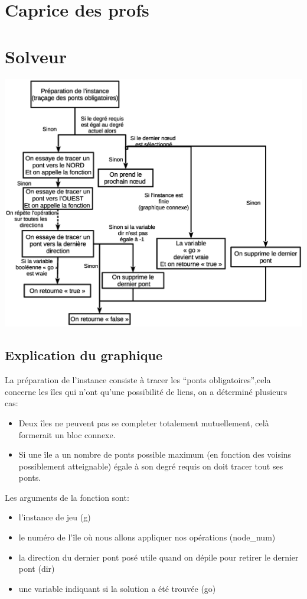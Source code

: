 \documentclass[12pt]{report}
\begin{document}
\chapter{Caprice des profs}

\chapter{Solveur}
\includegraphics[width = 1.00\textwidth]{explication_solveur.eps}
\section{Explication du graphique}
La préparation de l'instance consiste à tracer les ``ponts obligatoires'',cela concerne les îles qui n'ont qu'une possibilité de liens,
on a déterminé plusieurs cas:
\begin{itemize}
\item Deux îles ne peuvent pas se completer totalement mutuellement, celà formerait un bloc connexe.
\item Si une île a un nombre de ponts possible maximum (en fonction des voisins possiblement atteignable) égale à son degré requis on doit tracer tout ses ponts.
\end{itemize}

Les arguments de la fonction sont:
\begin{itemize}
\item l'instance de jeu (g)
\item le numéro de l'île où nous allons appliquer nos opérations (node\_num)
\item la direction du dernier pont posé utile quand on dépile pour retirer le dernier pont (dir)
\item une variable indiquant si la solution a été trouvée (go)
\end{itemize}
\end{document}
